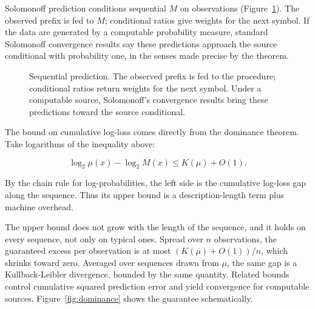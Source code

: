 Solomonoff prediction conditions sequential $M$ on observations (Figure~\ref{fig:sequential-prediction}). The observed prefix is fed to $M$; conditional ratios give weights for the next symbol. If the data are generated by a computable probability measure, standard Solomonoff convergence results say these predictions approach the source conditional with probability one, in the senses made precise by the theorem.

\begin{figure}[h]
\centering
{}
\caption{Sequential prediction. The observed prefix is fed to the procedure; conditional ratios return weights for the next symbol. Under a computable source, Solomonoff's convergence results bring these predictions toward the source conditional.}
\label{fig:sequential-prediction}
\end{figure}

The bound on cumulative log-loss comes directly from the dominance theorem. Take logarithms of the inequality above:

$$\log_2 \mu(x) - \log_2 M(x) \leq K(\mu) + O(1).$$

By the chain rule for log-probabilities, the left side is the cumulative log-loss gap along the sequence. Thus its upper bound is a description-length term plus machine overhead.

The upper bound does not grow with the length of the sequence, and it holds on every sequence, not only on typical ones. Spread over $n$ observations, the guaranteed excess per observation is at most $(K(\mu)+O(1))/n$, which shrinks toward zero. Averaged over sequences drawn from $\mu$, the same gap is a Kullback-Leibler divergence, bounded by the same quantity. Related bounds control cumulative squared prediction error and yield convergence for computable sources. Figure~\ref{fig:dominance} shows the guarantee schematically.

